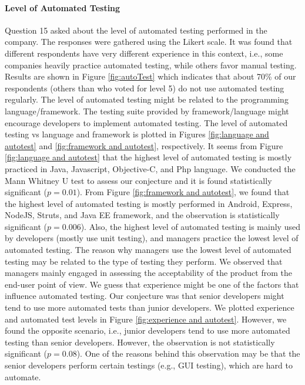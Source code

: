 \paragraph{Level of Automated Testing}
Question 15 asked about the level of automated testing  performed in the company. The responses were gathered using the Likert scale. It was found that different respondents have very different experience in this context, i.e., some companies heavily practice automated testing, while others favor manual testing.  Results are shown in Figure \ref{fig:autoTest} which indicates that about 70\% of our respondents (others than who voted for level 5) do not use automated testing regularly. The level of automated testing might be related to the programming language/framework. The testing suite provided by framework/language might encourage developers to implement automated testing. The level of automated testing vs language and framework is plotted in Figures \ref{fig:language and autotest} and \ref{fig:framework and autotest}, respectively. It seems from Figure \ref{fig:language and autotest} that the highest level of automated testing is mostly practiced in Java, Javascript, Objective-C, and Php language. We conducted the Mann Whitney U test to assess our conjecture and it is found statistically significant ($p=0.01$). From Figure \ref{fig:framework and autotest}, we found that the highest level of automated testing is mostly performed in Android, Express, NodeJS, Struts, and Java EE framework, and the observation is statistically significant ($p=0.006$). Also, the highest level of automated testing is mainly used by developers (mostly use unit testing), and managers practice the lowest level of automated testing. The reason why managers use the lowest level of automated testing may be related to the type of testing they perform. We observed that managers mainly engaged in assessing the acceptability of the product from the end-user point of view.  We guess that experience might be one of the factors that influence automated testing. Our conjecture was that senior developers might tend to use more automated tests than junior developers. We plotted experience and automated test levels in Figure \ref{fig:experience and autotest}. However, we found the opposite scenario, i.e., junior developers tend to use more automated testing than senior developers. However, the observation is not statistically significant ($p=0.08$). One of the reasons behind this observation may be that the senior developers perform certain testings (e.g., GUI testing), which are hard to automate.

